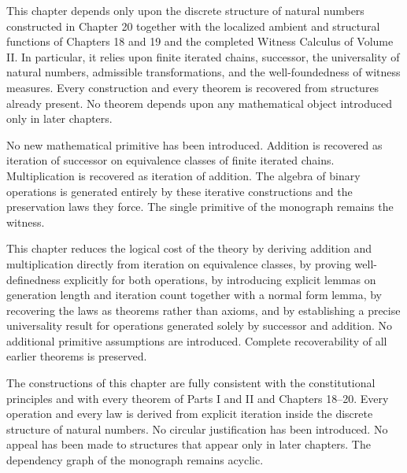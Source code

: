 \documentclass[12pt,anyside]{book}
\begin{document}
\begin{dependencyaudit}
This chapter depends only upon the discrete structure of natural numbers constructed in Chapter 20 together with the localized ambient and structural functions of Chapters 18 and 19 and the completed Witness Calculus of Volume II. In particular, it relies upon finite iterated chains, successor, the universality of natural numbers, admissible transformations, and the well-foundedness of witness measures. Every construction and every theorem is recovered from structures already present. No theorem depends upon any mathematical object introduced only in later chapters.
\end{dependencyaudit}

\begin{primitiveaudit}
No new mathematical primitive has been introduced. Addition is recovered as iteration of successor on equivalence classes of finite iterated chains. Multiplication is recovered as iteration of addition. The algebra of binary operations is generated entirely by these iterative constructions and the preservation laws they force. The single primitive of the monograph remains the witness.
\end{primitiveaudit}

\begin{reductionaudit}
This chapter reduces the logical cost of the theory by deriving addition and multiplication directly from iteration on equivalence classes, by proving well-definedness explicitly for both operations, by introducing explicit lemmas on generation length and iteration count together with a normal form lemma, by recovering the laws as theorems rather than axioms, and by establishing a precise universality result for operations generated solely by successor and addition. No additional primitive assumptions are introduced. Complete recoverability of all earlier theorems is preserved.
\end{reductionaudit}

\begin{consistencyaudit}
The constructions of this chapter are fully consistent with the constitutional principles and with every theorem of Parts I and II and Chapters 18--20. Every operation and every law is derived from explicit iteration inside the discrete structure of natural numbers. No circular justification has been introduced. No appeal has been made to structures that appear only in later chapters. The dependency graph of the monograph remains acyclic.
\end{consistencyaudit}
\end{document}
